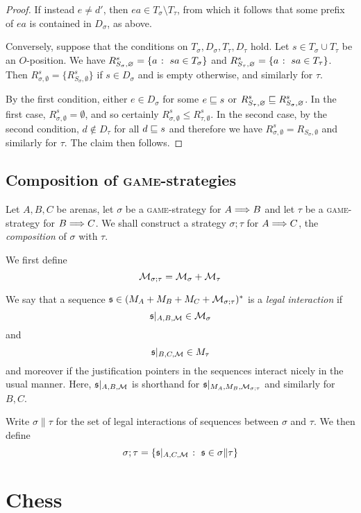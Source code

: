 \documentclass{article}
\newcommand{\game}{\textsc{game}}
\begin{document}
\begin{proof}
  If instead $e\neq d'$, then $ea\in T_\sigma\setminus T_\tau$, from which it follows that some prefix of $ea$ is contained in $D_\sigma$, as above.  

  Conversely, suppose that the conditions on $T_\sigma,D_\sigma,T_\tau,D_\tau$ hold.  
  Let $s\in T_\sigma\cup T_\tau$ be an $O$-position.  
  We have $R_{S_\sigma,\varnothing}^s = \{a\;\colon\; sa\in T_\sigma\}$ and $R_{S_\tau,\varnothing}^s = \{a\;\colon\; sa\in T_\tau\}$.  
  Then $R_{\sigma,\emptyset}^s=\{R_{S_\sigma,\emptyset}^s\}$ if $s\in D_\sigma$ and is empty otherwise, and similarly for $\tau$.  
  
  By the first condition, either $e\in D_\sigma$ for some $e\sqsubseteq s$ or $R_{S_\tau,\varnothing}^s\sqsubseteq R_{S_\sigma,\varnothing}^s$.  
  In the first case, $R_{\sigma,\emptyset}^s=\emptyset$, and so certainly $R_{\sigma,\emptyset}^s\le R_{\tau,\emptyset}^s$.  
  In the second case, by the second condition, $d\not\in D_\tau$ for all $d\sqsubseteq s$ and therefore we have $R_{\sigma,\emptyset}^s=R_{S_\sigma,\emptyset}$ and similarly for $\tau$.  
  The claim then follows.
\end{proof}

\subsection{Composition of \game{}-strategies}

Let $A,B,C$ be arenas, let $\sigma$ be a \game{}-strategy for $A\Longrightarrow B$ and let $\tau$ be a \game{}-strategy for $B\Longrightarrow C$.  
We shall construct a strategy $\sigma;\tau$ for $A\Longrightarrow C$, the \emph{composition} of $\sigma$ with $\tau$.  

We first define
\[
  \mathcal M_{\sigma;\tau}=\mathcal M_\sigma + \mathcal M_\tau
  \]

We say that a sequence $\mathfrak s\in (M_A + M_B + M_C + \mathcal M_{\sigma;\tau})^*$ is a \emph{legal interaction} if
\[
  \mathfrak s\vert_{A,B,\mathcal M}\in \mathcal M_\sigma
  \]
and
\[
  \mathfrak s\vert_{B,C,\mathcal M}\in M_\tau
  \]
and moreover if the justification pointers in the sequences interact nicely in the usual manner.  
Here, $\mathfrak s\vert_{A,B,\mathcal M}$ is shorthand for $\mathfrak s\vert_{M_A,M_B,\mathcal M_{\sigma;\tau}}$ and similarly for $B,C$.  

Write $\sigma\|\tau$ for the set of legal interactions of sequences between $\sigma$ and $\tau$.  
We then define
\[
  \sigma;\tau = \{\mathfrak s\vert_{A,C,\mathcal M}\;\colon\; \mathfrak s\in \sigma\|\tau\}
  \]

\section{Chess}
\end{document}

